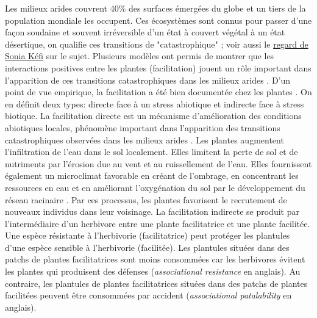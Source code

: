 \documentclass[12pt]{article} %
\begin{document}
Les milieux arides couvrent 40\% des surfaces émergées du globe et un tiers de la population mondiale les occupent. Ces écosystèmes sont connus pour passer d'une façon soudaine et souvent irréversible d'un  état à couvert végétal à un état désertique, on qualifie ces transitions de "catastrophique" \citep{Scheffer2001,Kefi2007}; voir aussi le \href{http://www.sfecologie.org/regards/2012/10/19/r37-hysteresis-sonia-kefi/}{regard de Sonia Kéfi} sur le sujet. Plusieurs modèles ont permis de montrer que les interactions positives entre les plantes (facilitation) jouent un rôle important dans l'apparition de ces transitions catastrophiques dans les milieux arides \citep{Kefi2007,Kefi2007a,Rietkerk2004}. D'un point de vue empirique, la facilitation a été bien documentée chez les plantes \citep{Callaway1995, Callaway1997}. On en définit deux types: directe face à un stress abiotique et indirecte face à stress biotique. La facilitation directe est un mécanisme d'amélioration des conditions abiotiques locales, phénomène important dans l'apparition des transitions catastrophiques observées dans les milieux arides \citep{Kefi2007a}. Les plantes augmentent l'infiltration de l'eau dans le sol localement. Elles limitent la perte de sol et de nutriments par l'érosion due au vent et au ruissellement de l'eau. Elles fournissent également un microclimat favorable en créant de l'ombrage, en concentrant les ressources en eau et en améliorant l'oxygénation du sol par le développement du réseau racinaire \citep{Rietkerk1997a}. Par ces processus, les plantes favorisent le recrutement de nouveaux individus dans leur voisinage. La facilitation indirecte se produit par l'intermédiaire d'un herbivore entre une plante facilitatrice et une plante facilitée. Une espèce résistante à l'herbivorie (facilitatrice) peut protéger les plantules d'une espèce sensible à l'herbivorie (facilitée). Les plantules situées dans des patchs de plantes facilitatrices sont moins consommées car les herbivores évitent les plantes qui produisent des défenses (\textit{associational resistance} en anglais). Au contraire, les plantules de plantes facilitatrices situées dans des patchs de plantes facilitées peuvent être consommées par accident (\textit{associational patalability} en anglais).
\end{document}
